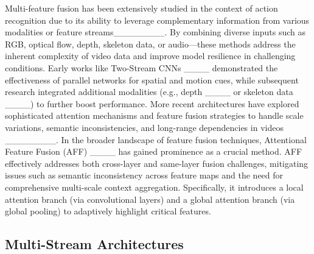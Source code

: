 Multi-feature fusion has been extensively studied in the context of action recognition due to its ability to leverage complementary information from various modalities or feature streams________. By combining diverse inputs such as RGB, optical flow, depth, skeleton data, or audio—these methods address the inherent complexity of video data and improve model resilience in challenging conditions. Early works like Two-Stream CNNs ____ demonstrated the effectiveness of parallel networks for spatial and motion cues, while subsequent research integrated additional modalities (e.g., depth ____ or skeleton data ____) to further boost performance. More recent architectures have explored sophisticated attention mechanisms and feature fusion strategies to handle scale variations, semantic inconsistencies, and long-range dependencies in videos ________.
In the broader landscape of feature fusion techniques, Attentional Feature Fusion (AFF) ____ has gained prominence as a crucial method. AFF effectively addresses both cross-layer and same-layer fusion challenges, mitigating issues such as semantic inconsistency across feature maps and the need for comprehensive multi-scale context aggregation. Specifically, it introduces a local attention branch (via convolutional layers) and a global attention branch (via global pooling) to adaptively highlight critical features. 



\subsection{Multi-Stream Architectures}

